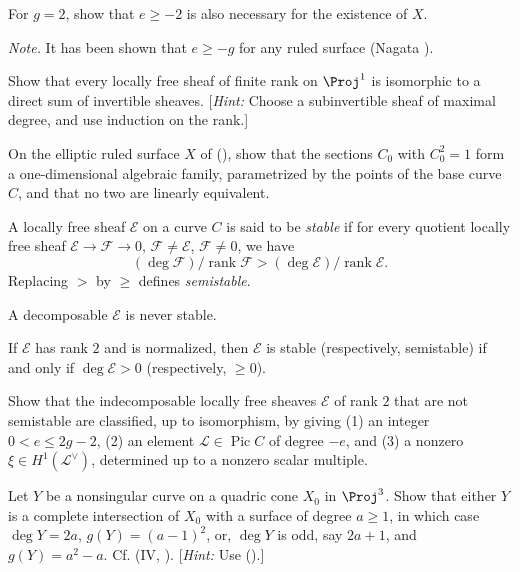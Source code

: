 {{\begin{description}[style=multiline,labelwidth=1.8em,leftmargin=2.15em,itemsep=3pt,topsep=0pt,parsep=0pt]
\begin{parts}
\item For $g=2$, show that $e\ge-2$ is also necessary for the existence of $X$.
\end{parts}
\emph{Note.} It has been shown that $e\ge-g$ for any ruled surface (Nagata ).
\item[\hypertarget{ex-V-2.6}{}2.6.] Show that every locally free sheaf of finite rank on $\Proj^1$ is isomorphic to a direct sum of invertible sheaves. [\emph{Hint:} Choose a subinvertible sheaf of maximal degree, and use induction on the rank.]
\item[\hypertarget{ex-V-2.7}{}2.7.] On the elliptic ruled surface $X$ of (), show that the sections $C_0$ with $C_0^2=1$ form a one-dimensional algebraic family, parametrized by the points of the base curve $C$, and that no two are linearly equivalent.
\item[\hypertarget{ex-V-2.8}{}2.8.] A locally free sheaf $\mathcal E$ on a curve $C$ is said to be \emph{stable} if for every quotient locally free sheaf $\mathcal E\to\mathcal F\to0$, $\mathcal F\ne\mathcal E$, $\mathcal F\ne0$, we have
\[
(\deg\mathcal F)/\operatorname{rank}\mathcal F>(\deg\mathcal E)/\operatorname{rank}\mathcal E.
\]
Replacing $>$ by $\ge$ defines \emph{semistable}.
\begin{parts}
\item A decomposable $\mathcal E$ is never stable.
\item If $\mathcal E$ has rank $2$ and is normalized, then $\mathcal E$ is stable (respectively, semistable) if and only if $\deg\mathcal E>0$ (respectively, $\ge0$).
\item Show that the \EditionText{}indecomposable locally free sheaves $\mathcal E$ of rank $2$ that are not semistable are classified, up to isomorphism, by giving (1) an integer $0<e\le2g-2$, (2) an element $\mathcal L\in\operatorname{Pic}C$ of degree $-e$, and (3) a nonzero $\xi\in H^1(\mathcal L^\vee)$, determined up to a nonzero scalar multiple.\EditionText{}
\end{parts}
\item[\hypertarget{ex-V-2.9}{}2.9.] Let $Y$ be a nonsingular curve on a quadric cone $X_0$ in $\Proj^3$. Show that either $Y$ is a complete intersection of $X_0$ with a surface of degree $a\ge1$, in which case $\deg Y=2a$, $g(Y)=(a-1)^2$, or, $\deg Y$ is odd, say $2a+1$, and $g(Y)=a^2-a$. Cf. (IV, ). [\emph{Hint:} Use ().]
\end{description}
}
}
